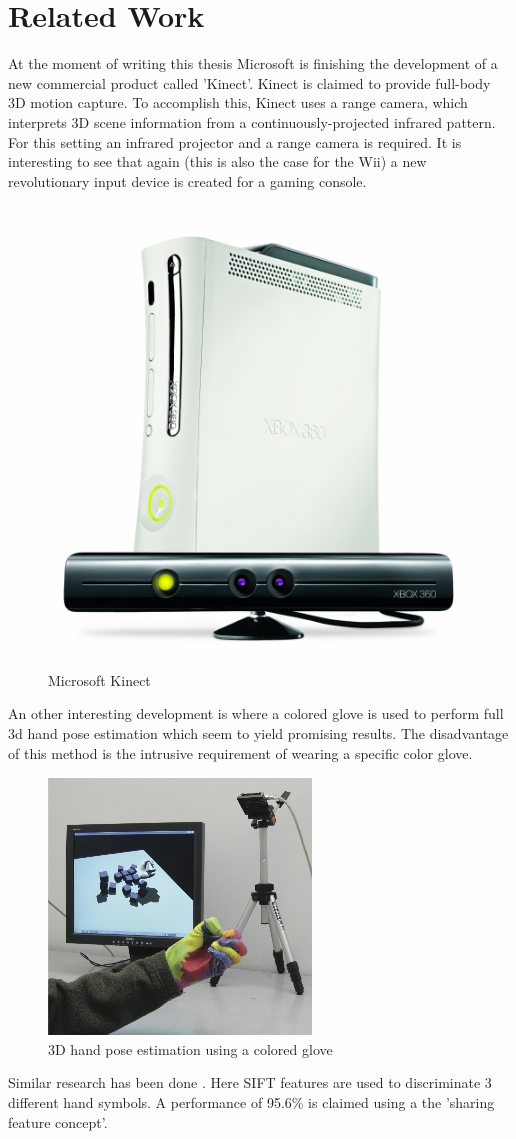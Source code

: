 \section{Related Work}
At the moment of writing this thesis Microsoft is finishing the development of a new commercial product called 'Kinect'. Kinect is claimed to provide full-body 3D motion capture. To accomplish this, Kinect uses a range camera, which interprets 3D scene information from a continuously-projected infrared pattern. For this setting an infrared projector and a range camera is required. It is interesting to see that again (this is also the case for the Wii) a new revolutionary input device is created for a gaming console. 

\begin{figure}[htbp]
	\center{}
	\label{fig:kinect}
	\includegraphics[width=0.3\linewidth]{figures/wave.jpg}
	\caption{Microsoft Kinect}
\end{figure}


An other interesting development is \cite{Wang2009} where a colored glove is used to perform full 3d hand pose estimation which seem to yield promising results. The disadvantage of this method is the intrusive requirement of wearing a specific color glove. 

\begin{figure}[htbp]
	\center{}
	\label{fig:wang2009}
	\includegraphics[width=0.3\linewidth]{figures/wang2009.jpg}
	\caption{3D hand pose estimation using a colored glove}
\end{figure}




Similar research has been done \cite{Wang2007}. Here SIFT features are used to discriminate 3 different hand symbols. A performance of 95.6\% is claimed using a the 'sharing feature concept'.


